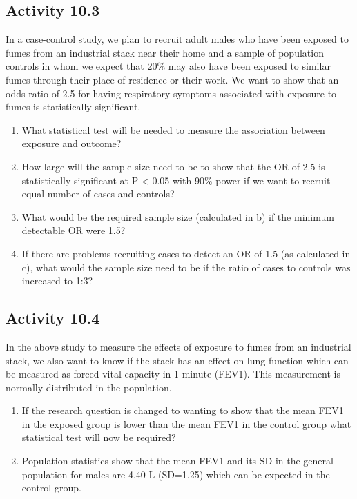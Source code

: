 \documentclass[
]{memoir}
\providecommand{\tightlist}{%
  \setlength{\itemsep}{0pt}\setlength{\parskip}{0pt}}
\begin{document}
\hypertarget{activity-10.3}{%
\subsection*{Activity 10.3}\label{activity-10.3}}

In a case-control study, we plan to recruit adult males who have been exposed to fumes from an industrial stack near their home and a sample of population controls in whom we expect that 20\% may also have been exposed to similar fumes through their place of residence or their work.
We want to show that an odds ratio of 2.5 for having respiratory symptoms associated with exposure to fumes is statistically significant.

\begin{enumerate}
\def\labelenumi{\alph{enumi})}
\tightlist
\item
  What statistical test will be needed to measure the association between exposure and outcome?
\item
  How large will the sample size need to be to show that the OR of 2.5 is statistically significant at P \textless{} 0.05 with 90\% power if we want to recruit equal number of cases and controls?
\item
  What would be the required sample size (calculated in b) if the minimum detectable OR were 1.5?
\item
  If there are problems recruiting cases to detect an OR of 1.5 (as calculated in c), what would the sample size need to be if the ratio of cases to controls was increased to 1:3?
\end{enumerate}

\hypertarget{activity-10.4}{%
\subsection*{Activity 10.4}\label{activity-10.4}}

In the above study to measure the effects of exposure to fumes from an industrial stack, we also want to know if the stack has an effect on lung function which can be measured as forced vital capacity in 1 minute (FEV1). This measurement is normally distributed in the population.

\begin{enumerate}
\def\labelenumi{\alph{enumi})}
\tightlist
\item
  If the research question is changed to wanting to show that the mean FEV1 in the exposed group is lower than the mean FEV1 in the control group what statistical test will now be required?
\item
  Population statistics show that the mean FEV1 and its SD in the general population for males are 4.40 L (SD=1.25) which can be expected in the control group.
\end{enumerate}
\end{document}
